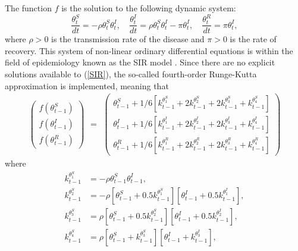 \documentclass[10pt,a4paper]{article}
\begin{document}
The function $f$ is the solution to the following dynamic system:
%
\begin{equation}\label{SIR}
	\frac{\theta_t^S}{dt} = -\rho\theta_t^S\theta_t^I, \quad \frac{\theta_t^I}{dt} = \rho\theta_t^S\theta_t^I - \pi \theta_t^I, \quad \frac{\theta_t^R}{dt} = \pi \theta_t^I,
\end{equation}
%
where $\rho > 0$ is the transmission rate of the disease and $\pi > 0$ is the rate of recovery. This system of non-linear ordinary differential equations is within the field of epidemiology known as the SIR model \parencite{kermack1927contribution}. Since there are no explicit solutions available to (\ref{SIR}), the so-called fourth-order Runge-Kutta approximation is implemented, meaning that 
%
$$
\begin{aligned}
	\begin{pmatrix}
		f(\theta_{t-1}^S) \\
		f(\theta_{t-1}^I) \\
		f(\theta_{t-1}^R)
	\end{pmatrix}
\end{aligned} = 
%
\begin{aligned}
	\begin{pmatrix}
		\theta_{t-1}^S + 1/6[k_{t-1}^{\theta^S_1} + 2k_{t-1}^{\theta^S_2} + 2k_{t-1}^{\theta^S_3} + k_{t-1}^{\theta^S_4}] \\
		\theta_{t-1}^I + 1/6[k_{t-1}^{\theta^I_1} + 2k_{t-1}^{\theta^I_2} + 2k_{t-1}^{\theta^I_3} + k_{t-1}^{\theta^I_4}] \\
		\theta_{t-1}^R + 1/6[k_{t-1}^{\theta^R_1} + 2k_{t-1}^{\theta^R_2} + 2k_{t-1}^{\theta^R_3} + k_{t-1}^{\theta^R_4}]
	\end{pmatrix}
\end{aligned}
$$
%
where 
%
\begin{equation*}
\begin{split}	
		k_{t-1}^{\theta^S_1} &= - \rho \theta_{t-1}^S \theta_{t-1}^I, \\
		k_{t-1}^{\theta^S_2} &= - \rho [\theta_{t-1}^S + 0.5 k_{t-1}^{\theta^S_1}] [\theta_{t-1}^I + 0.5 k_{t-1}^{\theta^I_1}], \\
		k_{t-1}^{\theta^S_3} &= \rho [\theta_{t-1}^S + 0.5 k_{t-1}^{\theta^S_2}] [\theta_{t-1}^I + 0.5 k_{t-1}^{\theta^I_2}], \\
		k_{t-1}^{\theta^S_4} &= \rho [\theta_{t-1}^S + k_{t-1}^{\theta^S_3}] [\theta_{t-1}^I + k_{t-1}^{\theta^I_3}],
\end{split}
\end{equation*}
%
\end{document}

